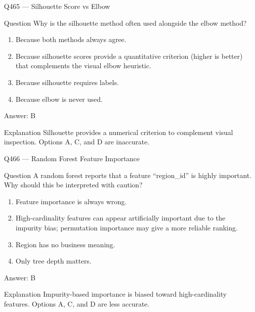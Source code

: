 \documentclass[aspectratio=169,8pt]{beamer}
\begin{document}
	\begin{frame}{Q465 --- Silhouette Score vs Elbow}
		\begin{block}{Question}
			Why is the silhouette method often used alongside the elbow method?
			\begin{enumerate}
				\item Because both methods always agree.
				\item Because silhouette scores provide a quantitative criterion (higher is better) that complements the visual elbow heuristic.
				\item Because silhouette requires labels.
				\item Because elbow is never used.
			\end{enumerate}
		\end{block}
		\begin{exampleblock}{Answer: B}\end{exampleblock}
		\begin{block}{Explanation}
			Silhouette provides a numerical criterion to complement visual inspection. Options A, C, and D are inaccurate.
		\end{block}
	\end{frame}
	
	\begin{frame}{Q466 --- Random Forest Feature Importance}
		\begin{block}{Question}
			A random forest reports that a feature ``region\_id'' is highly important. Why should this be interpreted with caution?
			\begin{enumerate}
				\item Feature importance is always wrong.
				\item High-cardinality features can appear artificially important due to the impurity bias; permutation importance may give a more reliable ranking.
				\item Region has no business meaning.
				\item Only tree depth matters.
			\end{enumerate}
		\end{block}
		\begin{exampleblock}{Answer: B}\end{exampleblock}
		\begin{block}{Explanation}
			Impurity-based importance is biased toward high-cardinality features. Options A, C, and D are less accurate.
		\end{block}
	\end{frame}
	
\end{document}
